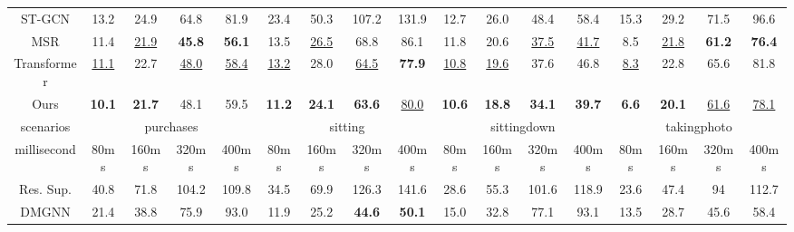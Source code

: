 \begin{table}[h]
{\begin{tabular}{c|cccc|cccc|cccc|cccc}
ST-GCN       & 13.2          & 24.9          & 64.8          & 81.9          & 23.4          & 50.3          & 107.2         & 131.9          & 12.7          & 26.0          & 48.4          & 58.4          & 15.3          & 29.2          & 71.5          & 96.6          \\
MSR   & 11.4          & \underline{21.9}          & \textbf{45.8} & \textbf{56.1} & 13.5          & \underline{26.5}          & 68.8          & 86.1           & 11.8          & 20.6          & \underline{37.5}          & \underline{41.7}          & 8.5           & \underline{21.8}          & \textbf{61.2} & \textbf{76.4} \\
Transformer & \underline{11.1}          & 22.7          & \underline{48.0}          & \underline{58.4}          & \underline{13.2}          & 28.0          & \underline{64.5}          & \textbf{77.9}  & \underline{10.8}          & \underline{19.6}          & 37.6          & 46.8          & \underline{8.3}           & 22.8          & 65.6          & 81.8          \\
Ours   & \textbf{10.1} & \textbf{21.7} & 48.1          & 59.5          & \textbf{11.2} & \textbf{24.1} & \textbf{63.6} & \underline{80.0}           & \textbf{10.6} & \textbf{18.8} & \textbf{34.1} & \textbf{39.7} & \textbf{6.6}  & \textbf{20.1} & \underline{61.6}          & \underline{78.1}          \\ \hline
scenarios   & \multicolumn{4}{c|}{purchases}                                 & \multicolumn{4}{c|}{sitting}                                    & \multicolumn{4}{c|}{sittingdown}                               & \multicolumn{4}{c}{takingphoto}                               \\ \hline
millisecond & 80ms          & 160ms         & 320ms         & 400ms         & 80ms          & 160ms         & 320ms         & 400ms          & 80ms          & 160ms         & 320ms         & 400ms         & 80ms          & 160ms         & 320ms         & 400ms         \\ \hline
Res. Sup.   & 40.8          & 71.8          & 104.2         & 109.8         & 34.5          & 69.9          & 126.3         & 141.6          & 28.6          & 55.3          & 101.6         & 118.9         & 23.6          & 47.4          & 94            & 112.7         \\
DMGNN       & 21.4          & 38.8          & 75.9          & 93.0          & 11.9          & 25.2          & \textbf{44.6}          & \textbf{50.1}           & 15.0          & 32.8          & 77.1          & 93.1          & 13.5          & 28.7          & 45.6          & 58.4          \\

\end{tabular}}
\end{table}
